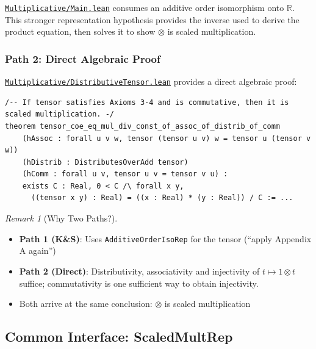 \documentclass[11pt]{article}
\theoremstyle{definition}
\theoremstyle{remark}
\newtheorem{remark}[theorem]{Remark}
\begin{document}
\href{https://github.com/zariuq/ks-foundations-of-inference/blob/main/KnuthSkilling/Multiplicative/Main.lean}{\texttt{Multiplicative/Main.lean}} consumes an additive order isomorphism onto $\mathbb{R}$.
This stronger representation hypothesis provides the inverse used to derive the product equation,
then solves it to show $\otimes$ is scaled multiplication.

\subsubsection{Path 2: Direct Algebraic Proof}

\href{https://github.com/zariuq/ks-foundations-of-inference/blob/main/KnuthSkilling/Multiplicative/DistributiveTensor.lean}{\texttt{Multiplicative/DistributiveTensor.lean}} provides a direct algebraic proof:

\begin{lstlisting}[caption={Direct proof: Axioms 3--4 + commutativity $\Rightarrow$ scaled multiplication (\href{https://github.com/zariuq/ks-foundations-of-inference/blob/main/KnuthSkilling/Multiplicative/DistributiveTensor.lean}{DistributiveTensor.lean})},numbers=none]
/-- If tensor satisfies Axioms 3-4 and is commutative, then it is scaled multiplication. -/
theorem tensor_coe_eq_mul_div_const_of_assoc_of_distrib_of_comm
    (hAssoc : forall u v w, tensor (tensor u v) w = tensor u (tensor v w))
    (hDistrib : DistributesOverAdd tensor)
    (hComm : forall u v, tensor u v = tensor v u) :
    exists C : Real, 0 < C /\ forall x y,
      ((tensor x y) : Real) = ((x : Real) * (y : Real)) / C := ...
\end{lstlisting}

\begin{remark}[Why Two Paths?]\leavevmode
\begin{itemize}
\item \textbf{Path 1 (K\&S)}: Uses \texttt{AdditiveOrderIsoRep} for the tensor (``apply Appendix A again'')
\item \textbf{Path 2 (Direct)}: Distributivity, associativity and injectivity of $t\mapsto1\otimes t$ suffice; commutativity is one sufficient way to obtain injectivity.
\item Both arrive at the same conclusion: $\otimes$ is scaled multiplication
\end{itemize}
\end{remark}

\subsection{Common Interface: ScaledMultRep}
\end{document}
